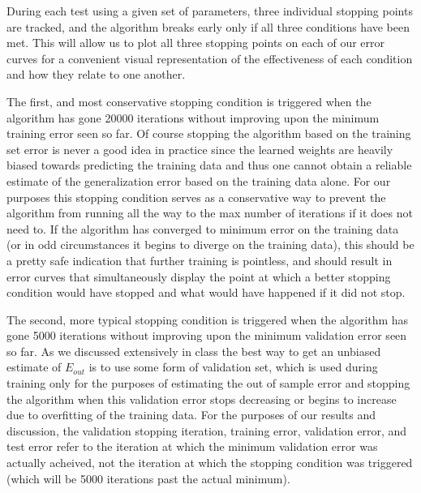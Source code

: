 \documentclass[runningheads]{llncs}
\begin{document}
During each test using a given set of parameters, three individual stopping points are tracked, and the algorithm breaks early only if all three conditions have been met. This will allow us to plot all three stopping points on each of our error curves for a convenient visual representation of the effectiveness of each condition and how they relate to one another. 

The first, and most conservative stopping condition is triggered when the algorithm has gone 20000 iterations without improving upon the minimum training error seen so far. Of course stopping the algorithm based on the training set error is never a good idea in practice since the learned weights are heavily biased towards predicting the training data and thus one cannot obtain a reliable estimate of the generalization error based on the training data alone. For our purposes this stopping condition serves as a conservative way to prevent the algorithm from running all the way to the max number of iterations if it does not need to. If the algorithm has converged to minimum error on the training data (or in odd circumstances it begins to diverge on the training data), this should be a pretty safe indication that further training is pointless, and should result in error curves that simultaneously display the point at which a better stopping condition would have stopped and what would have happened if it did not stop. 

The second, more typical stopping condition is triggered when the algorithm has gone 5000 iterations without improving upon the minimum validation error seen so far. As we discussed extensively in class the best way to get an unbiased estimate of $E_{out}$ is to use some form of validation set, which is used during training only for the purposes of estimating the out of sample error and stopping the algorithm when this validation error stops decreasing or begins to increase due to overfitting of the training data. For the purposes of our results and discussion, the validation stopping iteration, training error, validation error, and test error refer to the iteration at which the minimum validation error was actually acheived, not the iteration at which the stopping condition was triggered (which will be 5000 iterations past the actual minimum). 
\end{document}
